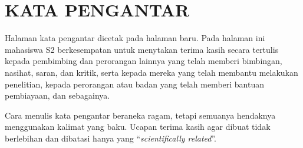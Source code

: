 \chapter{KATA PENGANTAR}
\label{chp:pengantar}
\vspace{\baselineskip}

Halaman kata pengantar dicetak pada halaman baru. Pada halaman ini mahasiswa S2 berkesempatan untuk menytakan terima kasih secara tertulis kepada pembimbing dan perorangan lainnya yang telah memberi bimbingan, nasihat, saran, dan kritik, serta kepada mereka yang telah membantu melakukan penelitian, kepada perorangan atau badan yang telah memberi bantuan pembiayaan, dan sebagainya.
\vspace{\baselineskip}

Cara menulis kata pengantar beraneka ragam, tetapi semuanya hendaknya menggunakan kalimat yang baku. Ucapan terima kasih agar dibuat tidak berlebihan dan dibatasi hanya yang ``\emph{scientifically related}''.
